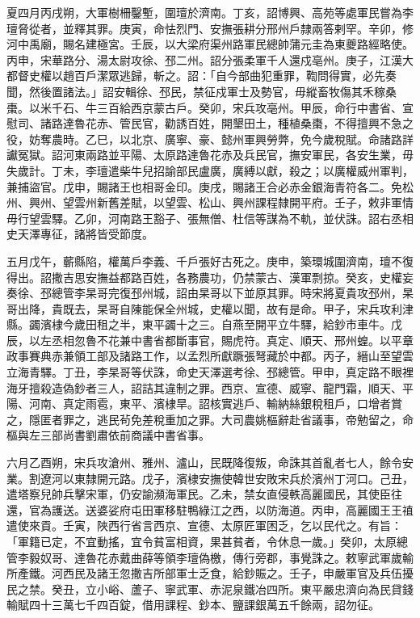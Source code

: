 \begin{pinyinscope}
 夏四月丙戌朔，大軍樹柵鑿塹，圍璮於濟南。丁亥，詔博興、高苑等處軍民嘗為李璮脅從者，並釋其罪。庚寅，命怯烈門、安撫張耕分邢州戶隸兩答剌罕。辛卯，修河中禹廟，賜名建極宮。壬辰，以大梁府渠州路軍民總帥蒲元圭為東夔路經略使。丙申，宋華路分、湯太尉攻徐、邳二州。詔分張柔軍千人還戍亳州。庚子，江漢大都督史權以趙百戶潔眾逃歸，斬之。詔：「自今部曲犯重罪，鞫問得實，必先奏聞，然後置諸法。」詔安輯徐、邳民，禁征戍軍士及勢官，毋縱畜牧傷其禾稼桑棗。以米千石、牛三百給西京蒙古戶。癸卯，宋兵攻亳州。甲辰，命行中書省、宣慰司、諸路達魯花赤、管民官，勸誘百姓，開墾田土，種植桑棗，不得擅興不急之役，妨奪農時。乙巳，以北京、廣寧、豪、懿州軍興勞弊，免今歲稅賦。命諸路詳讞冤獄。詔河東兩路並平陽、太原路達魯花赤及兵民官，撫安軍民，各安生業，毋失歲計。丁未，李璮遣柴牛兒招諭部民盧廣，廣縛以獻，殺之；以廣權威州軍判，兼捕盜官。戊申，賜諸王也相哥金印。庚戌，賜諸王合必赤金銀海青符各二。免松州、興州、望雲州新舊差賦，以望雲、松山、興州課程隸開平府。壬子，敕非軍情毋行望雲驛。乙卯，河南路王豁子、張無僧、杜信等謀為不軌，並伏誅。詔右丞相史天澤專征，諸將皆受節度。



 五月戊午，蘄縣陷，權萬戶李義、千戶張好古死之。庚申，築環城圍濟南，璮不復得出。詔撒吉思安撫益都路百姓，各務農功，仍禁蒙古、漢軍剽掠。癸亥，史權妄奏徐、邳總管李杲哥完復邳州城，詔由杲哥以下並原其罪。時宋將夏貴攻邳州，杲哥出降，貴既去，杲哥自陳能保全州城，史權以聞，故有是命。甲子，宋兵攻利津縣。蠲濱棣今歲田租之半，東平蠲十之三。自燕至開平立牛驛，給鈔市車牛。戊辰，以左丞相忽魯不花兼中書省都斷事官，賜虎符。真定、順天、邢州蝗。以平章政事賽典赤兼領工部及諸路工作，以孟烈所獻蹶張弩藏於中都。丙子，縉山至望雲立海青驛。丁丑，李杲哥等伏誅，命史天澤選考徐、邳總管。甲申，真定路不眼裡海牙擅殺造偽鈔者三人，詔詰其違制之罪。西京、宣德、威寧、龍門霜，順天、平陽、河南、真定雨雹，東平、濱棣旱。詔核實逃戶、輸納絲銀稅租戶，口增者賞之，隱匿者罪之，逃民茍免差稅重加之罪。大司農姚樞辭赴省議事，帝勉留之，命樞與左三部尚書劉肅依前商議中書省事。



 六月乙酉朔，宋兵攻滄州、雅州、瀘山，民既降復叛，命誅其首亂者七人，餘令安業。割遼河以東隸開元路。戊子，濱棣安撫使韓世安敗宋兵於濱州丁河口。己丑，遣塔察兒帥兵擊宋軍，仍安諭瀕海軍民。乙未，禁女直侵軼高麗國民，其使臣往還，官為護送。送婆娑府屯田軍移駐鴨綠江之西，以防海道。丙申，高麗國王王禃遣使來貢。壬寅，陜西行省言西京、宣德、太原匠軍困乏，乞以民代之。有旨：「軍籍已定，不宜動搖，宜令貧富相資，果甚貧者，令休息一歲。」癸卯，太原總管李毅奴哥、達魯花赤戴曲薛等領李璮偽檄，傳行旁郡，事覺誅之。敕寧武軍歲輸所產鐵。河西民及諸王忽撒吉所部軍士乏食，給鈔賑之。壬子，申嚴軍官及兵伍擾民之禁。癸丑，立小峪、蘆子、寧武軍、赤泥泉鐵冶四所。東平嚴忠濟向為民貸錢輸賦四十三萬七千四百錠，借用課程、鈔本、鹽課銀萬五千餘兩，詔勿征。




\end{pinyinscope}
